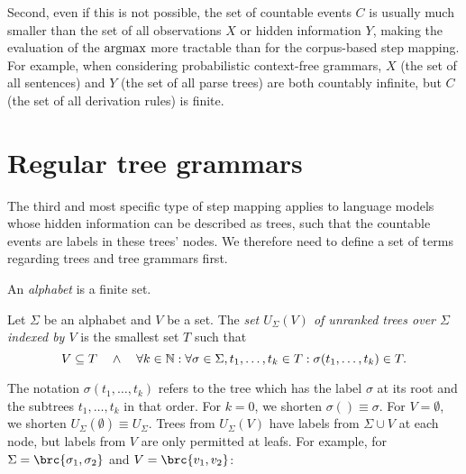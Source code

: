 Second, even if this is not possible, the set of countable events $C$ is
usually much smaller than the set of all observations $X$ or hidden information
$Y$, making the evaluation of the $\argmax$ more tractable than for the
corpus-based step mapping. For example, when considering probabilistic
context-free grammars, $X$ (the set of all sentences) and $Y$ (the set of all
parse trees) are both countably infinite, but $C$ (the set of all derivation
rules) is finite.

\section{Regular tree grammars}

The third and most specific type of step mapping applies to language models
whose hidden information can be described as trees, such that the countable
events are labels in these trees' nodes. We therefore need to define a set of
terms regarding trees and tree grammars first.

\begin{definition}
 An \emph{alphabet} is a finite set.
\end{definition}

\begin{definition}
 Let $\Sigma$ be an alphabet and $V$ be a set. The \emph{set $U_\Sigma(V)$ of
 unranked trees over $\Sigma$ indexed by $V$} is the smallest set $T$ such that
 \[
  V \subseteq T \quad\wedge\quad \forall k\in\mathbb N: \forall \sigma\in\Sigma, t_1,\ldots,t_k\in T: \sigma(t_1,\ldots,t_k)\in T.
 \]
\end{definition}

The notation $\sigma(t_1,\ldots,t_k)$ refers to the tree which has the label
$\sigma$ at its root and the subtrees $t_1,\ldots,t_k$ in that order. For
$k=0$, we shorten $\sigma() \equiv \sigma$. For $V=\emptyset$, we shorten
$U_\Sigma(\emptyset) \equiv U_\Sigma$. Trees from $U_\Sigma(V)$ have labels
from $\Sigma\cup V$ at each node, but labels from $V$ are only permitted at
leafs. For example, for $\Sigma = \brc{\sigma_1,\sigma_2}$ and
$V=\brc{v_1,v_2}$:

